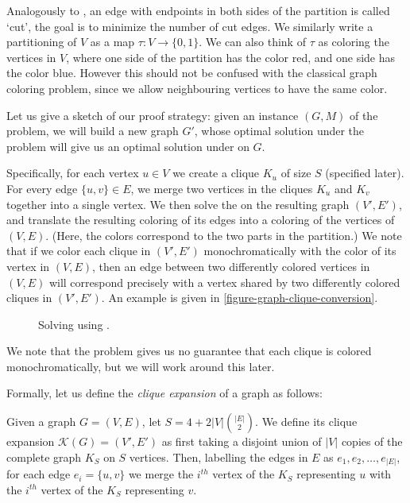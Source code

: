 	Analogously to \geb, an edge with endpoints in both sides of the
	partition is called `cut', the goal is to minimize the number of
	cut edges. We similarly write a partitioning of $V$ as
	a map $\tau : V \to \{0, 1\}$. We can also think of $\tau$ as coloring
	the vertices in $V$, where one side of the partition has the color red, and one
	side has the color blue. However this should not be confused with the classical
	graph coloring problem, since we allow neighbouring vertices to have the
	same color.

	Let us give a sketch of our proof strategy:
	given an instance $(G, M)$ of the \gb problem, we
	will build a new graph $G'$, whose optimal solution under the 
	\geb problem will give us an optimal solution under \gb on $G$.

	Specifically, for each vertex $u \in V$ we create a clique $K_u$ of size
	$S$ (specified later). For every edge $\{u, v\} \in E$, we merge
	two vertices in the cliques $K_u$ and $K_v$ together into a single
	vertex. We then solve the \geb on the resulting graph $(V', E')$, and
	translate the resulting coloring of its edges into a coloring of the
	vertices of $(V, E)$. (Here, the colors correspond to the two parts in the
	partition.) We note that if we color each clique in $(V', E')$
	monochromatically with the color of its vertex in $(V, E)$, then
	an edge between two differently colored vertices in $(V, E)$ will
	correspond precisely with a vertex shared by two differently colored
	cliques in $(V', E')$.
	An example is given in \autoref{figure-graph-clique-conversion}.

	\begin{figure}[h]
		
		\centering
		\caption{Solving \gb using \geb.}
		\label{figure-graph-clique-conversion}
	\end{figure}

	We note that
	the \geb problem gives us no guarantee that each clique is colored
	monochromatically, but we will work around this later.

	Formally, let us define the \textit{clique expansion} of a graph as
	follows:

	\begin{definition}
		\label{clique-expansion}
		Given a graph $G = (V, E)$,
		let $S = 4 + 2|V|\binom{|E|}{2}$.
		We define its clique expansion
		$\mathcal{K}(G) = (V', E')$ as first taking a disjoint union of $|V|$
		copies of the complete graph $K_S$ on $S$ vertices. Then, labelling the
		edges in $E$ as $e_1, e_2, \dots, e_{|E|}$, for each edge
		$e_i = \{u, v\}$
		we merge the $i^{th}$ vertex of the $K_S$ representing $u$ with the
		$i^{th}$ vertex of the $K_S$ representing $v$.
	\end{definition}

